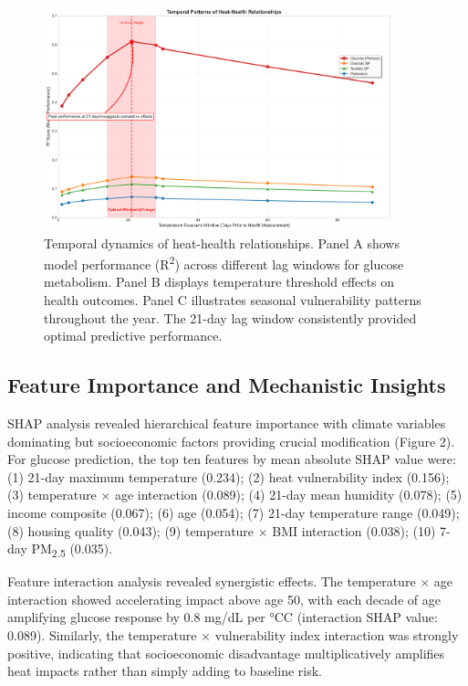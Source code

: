 \documentclass[11pt,a4paper]{article}
\newcommand{\degrees}{°C}
\begin{document}
\begin{figure}[H]
\centering
\includegraphics[width=0.9\textwidth]{heat_analysis_optimized/analysis/Figure2_TemporalPatterns_Fixed.png}
\caption{Temporal dynamics of heat-health relationships. Panel A shows model performance (R\textsuperscript{2}) across different lag windows for glucose metabolism. Panel B displays temperature threshold effects on health outcomes. Panel C illustrates seasonal vulnerability patterns throughout the year. The 21-day lag window consistently provided optimal predictive performance.}
\label{fig:temporal_patterns}
\end{figure}

\subsection{Feature Importance and Mechanistic Insights}

SHAP analysis revealed hierarchical feature importance with climate variables dominating but socioeconomic factors providing crucial modification (Figure 2). For glucose prediction, the top ten features by mean absolute SHAP value were: (1) 21-day maximum temperature (0.234); (2) heat vulnerability index (0.156); (3) temperature $\times$ age interaction (0.089); (4) 21-day mean humidity (0.078); (5) income composite (0.067); (6) age (0.054); (7) 21-day temperature range (0.049); (8) housing quality (0.043); (9) temperature $\times$ BMI interaction (0.038); (10) 7-day PM\textsubscript{2.5} (0.035).

Feature interaction analysis revealed synergistic effects. The temperature $\times$ age interaction showed accelerating impact above age 50, with each decade of age amplifying glucose response by 0.8 mg/dL per \degrees C (interaction SHAP value: 0.089). Similarly, the temperature $\times$ vulnerability index interaction was strongly positive, indicating that socioeconomic disadvantage multiplicatively amplifies heat impacts rather than simply adding to baseline risk.
\end{document}
